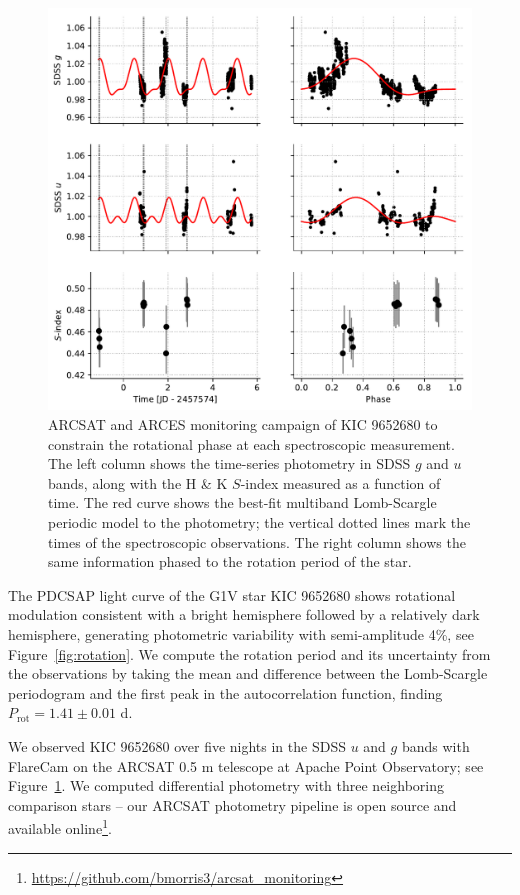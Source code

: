 \begin{figure}
    \centering
    \includegraphics[scale=0.9]{nephelion/arcsat.pdf}
    \caption{ARCSAT and ARCES monitoring campaign of KIC 9652680 to constrain the rotational phase at each spectroscopic measurement. The left column shows the time-series photometry in SDSS $g$ and $u$ bands, along with the  H \& K $S$-index measured as a function of time. The red curve shows the best-fit multiband Lomb-Scargle periodic model to the photometry; the vertical dotted lines mark the times of the spectroscopic observations. The right column shows the same information phased to the rotation period of the star.}
    \label{fig:arcsat}
\end{figure}

The \kepler PDCSAP light curve of the G1V star KIC 9652680 shows rotational modulation consistent with a bright hemisphere followed by a relatively dark hemisphere, generating photometric variability with semi-amplitude 4\%, see Figure~\ref{fig:rotation}. We compute the rotation period and its uncertainty from the \kepler observations by taking the mean and difference between the Lomb-Scargle periodogram and the first peak in the autocorrelation function, finding $P_\mathrm{rot} = 1.41 \pm 0.01$ d.

We observed KIC 9652680 over five nights in the SDSS $u$ and $g$ bands with FlareCam on the ARCSAT 0.5 m telescope at Apache Point Observatory; see Figure~\ref{fig:arcsat}. We computed differential photometry with three neighboring comparison stars -- our ARCSAT photometry pipeline is open source and available online\footnote{\url{https://github.com/bmorris3/arcsat_monitoring}}. 

